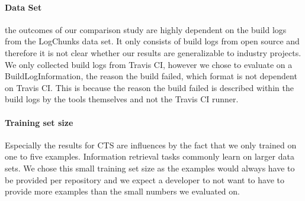 \documentclass[\myrootdir/main.tex]{subfiles}
\begin{document}
\paragraph{Data Set} the outcomes of our comparison study are highly dependent on the build logs from the LogChunks data set.
It only consists of build logs from open source and therefore it is not clear whether our results are generalizable to industry projects.
We only collected build logs from Travis CI, however we chose to evaluate on a BuildLogInformation, the reason the build failed, which format is not dependent on Travis CI.
This is because the reason the build failed is described within the build logs by the tools themselves and not the Travis CI runner.

\paragraph{Training set size}
Especially the results for CTS are influences by the fact that we only trained on one to five examples.
Information retrieval tasks commonly learn on larger data sets. 
We chose this small training set size as the examples would always have to be provided per repository and we expect a developer to not want to have to provide more examples than the small numbers we evaluated on.

\end{document}
